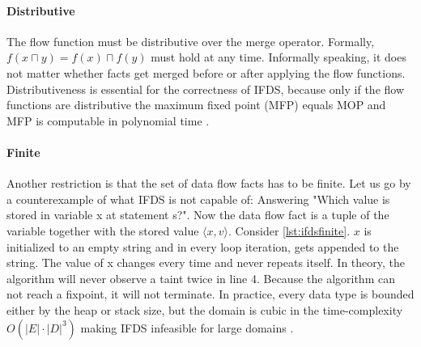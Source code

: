\documentclass[../draft.tex]{subfiles}
\begin{document}
    \paragraph{Distributive} The flow function must be distributive over the merge operator. 
    Formally, $f(x \sqcap y) = f(x) \sqcap f(y)$ must hold at any time. 
    Informally speaking, it does not matter whether facts get merged before or after applying the flow functions. 
    Distributiveness is essential for the correctness of IFDS, because only if the flow functions are distributive the maximum fixed point (MFP) equals MOP and MFP is computable in polynomial time \cite{Khedker2009,Reps1995}.

    \paragraph{Finite} Another restriction is that the set of data flow facts has to be finite. 
    Let us go by a counterexample of what IFDS is not capable of: Answering "Which value is stored in variable x at statement s?".
    Now the data flow fact is a tuple of the variable together with the stored value $\langle x, v \rangle$. 
    Consider \autoref{lst:ifdsfinite}. 
    $x$ is initialized to an empty string and in every loop iteration,  gets appended to the string. 
    The value of x changes every time and never repeats itself. 
    In theory, the algorithm will never observe a taint twice in line 4. 
    Because the algorithm can not reach a fixpoint, it will not terminate. 
    In practice, every data type is bounded either by the heap or stack size, but the domain is cubic in the time-complexity $O(|E| \cdot |D|^3)$ making IFDS infeasible for large domains \cite{Reps1995}.
\end{document}
